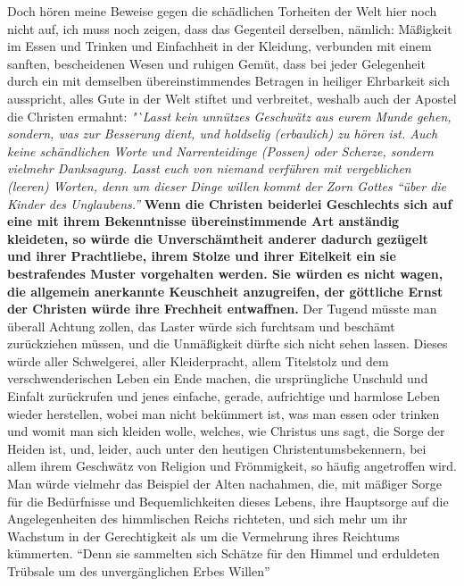 Doch hören meine Beweise gegen die schädlichen Torheiten der Welt hier noch
nicht auf, ich muss noch zeigen, dass das Gegenteil derselben, nämlich:
Mäßigkeit
im Essen und Trinken und Einfachheit in der Kleidung, verbunden mit einem
sanften, bescheidenen Wesen und ruhigen Gemüt, dass bei jeder Gelegenheit durch
ein mit demselben übereinstimmendes Betragen in heiliger Ehrbarkeit sich
ausspricht, alles Gute in der Welt stiftet und verbreitet, weshalb auch der
Apostel die Christen ermahnt:
\textit{"`Lasst kein unnützes Geschwätz aus eurem Munde
gehen, sondern, was zur Besserung dient, und holdselig (erbaulich) zu hören
ist. Auch keine schändlichen Worte und Narrenteidinge (Possen) oder Scherze,
sondern vielmehr Danksagung. Lasst euch von niemand verführen mit vergeblichen
(leeren) Worten, denn um dieser Dinge willen kommt der Zorn Gottes "`über die
Kinder des Unglaubens."'}
\label{ref:18_08_vorbild_kleidung}\textbf{Wenn die Christen
beiderlei Geschlechts sich auf eine mit ihrem Bekenntnisse übereinstimmende Art
anständig kleideten, so würde die Unverschämtheit anderer dadurch gezügelt und
ihrer Prachtliebe, ihrem Stolze und ihrer Eitelkeit ein sie bestrafendes Muster
vorgehalten werden. Sie würden es nicht wagen, die allgemein anerkannte
Keuschheit anzugreifen, der göttliche Ernst der Christen würde ihre Frechheit
entwaffnen.} Der Tugend müsste man überall Achtung zollen, das Laster würde
sich furchtsam und beschämt zurückziehen müssen, und die Unmäßigkeit dürfte sich
nicht sehen lassen. Dieses würde aller Schwelgerei, aller Kleiderpracht, allem
Titelstolz und dem verschwenderischen Leben ein Ende machen, die ursprüngliche
Unschuld und Einfalt zurückrufen und jenes einfache, gerade, aufrichtige und
harmlose Leben wieder herstellen, wobei man nicht bekümmert ist, was man essen
oder trinken und womit man sich kleiden wolle, welches, wie Christus uns sagt,
die Sorge der Heiden ist, und, leider, auch unter den heutigen
Christentumsbekennern, bei allem ihrem Geschwätz von Religion und
Frömmigkeit, so häufig angetroffen wird. Man würde vielmehr das Beispiel der
Alten nachahmen, die, mit mäßiger Sorge für die Bedürfnisse und Bequemlichkeiten
dieses Lebens, ihre Hauptsorge auf die Angelegenheiten des himmlischen
Reichs
richteten, und sich mehr um ihr Wachstum in der Gerechtigkeit als um die
Vermehrung ihres Reichtums kümmerten. "`Denn sie sammelten sich Schätze für
den Himmel und erduldeten Trübsale um des unvergänglichen Erbes
Willen"'

